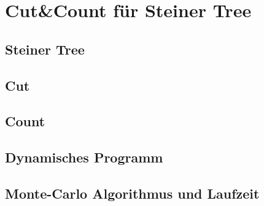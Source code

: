 %
%
%
\chapter{Cut\&Count für Steiner Tree}
\label{c:cc_steiner} %


\section{Steiner Tree}
\label{sec:steiner}

\section{Cut}
\label{sec:st_cut}

\section{Count}
\label{sec:st_count}

\section{Dynamisches Programm}
\label{sec:dynP}

\section{Monte-Carlo Algorithmus und Laufzeit}
\label{sec:mc_alg}
